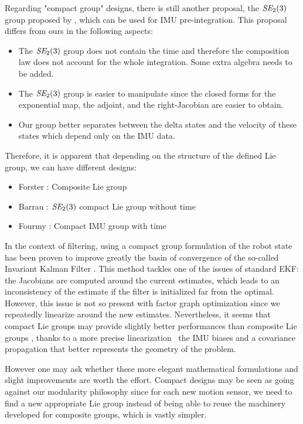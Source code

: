 Regarding "compact group" designs, there is still another proposal, the $\textit{SE}_2(3)$ group proposed by \cite{barrau2020mathematical, brossard2021associating}, 
which can be used for IMU pre-integration. This proposal differs from ours in the following aspects:

\begin{itemize}
    \item The $\textit{SE}_2(3)$ group does not contain the time and therefore the composition law does not account for the whole integration. Some extra algebra needs to be added.
    \item The $\textit{SE}_2(3)$ group is easier to manipulate since the closed forms for the exponential map, the adjoint, and the right-Jacobian are easier to obtain.
    \item Our group better separates between the delta states and the velocity of these states which depend only on the IMU data.
\end{itemize}

Therefore, it is apparent that depending on the structure of the defined Lie group, we can have different designs:
\begin{itemize}
    \item Forster \cite{forster2015imu}: Composite Lie group
    \item Barrau \cite{barrau2020mathematical}: $\textit{SE}_2(3)$ compact Lie group without time
    \item Fourmy \cite{fourmy2019absolute}: Compact IMU group with time
\end{itemize}

In the context of filtering, using a compact group formulation of the robot state has been proven to improve greatly the basin of convergence of the so-called
Invariant Kalman Filter \cite{barrau2018invariant, hartley2020contact}. This method tackles one of the issues of standard EKF: 
the Jacobians are computed around the current estimates, which leads to an inconsistency of the estimate if the filter is initialized far from the optimal. 
However, this issue is not so present with factor graph optimization since we repeatedly linearize around the new estimates.
Nevertheless, it seems that compact Lie groups may provide slightly better performances than composite Lie groups \cite{brossard2021associating}, thanks 
to a more precise linearization \wrt\ the IMU biases and a covariance propagation that better represents the geometry of the problem.

However one may ask whether these more elegant mathematical formulations and slight improvements are worth the effort. Compact designs may be seen as going against
our modularity philosophy since for each new motion sensor, we need to find a new appropriate Lie group instead of being able to reuse the machinery developed
for composite groups, which is vastly simpler.




